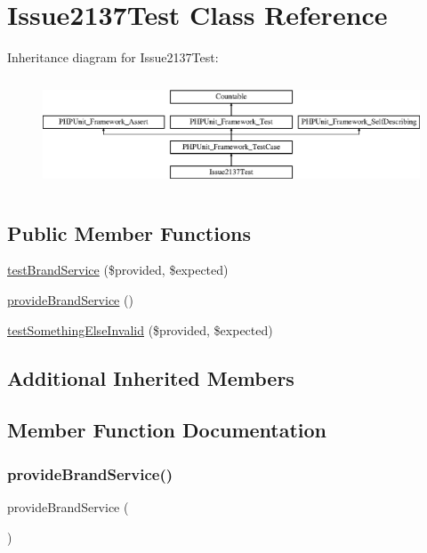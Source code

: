 \hypertarget{class_issue2137_test}{}\section{Issue2137\+Test Class Reference}
\label{class_issue2137_test}
Inheritance diagram for Issue2137\+Test\+:\begin{figure}[H]
\begin{center}
\leavevmode
\includegraphics[height=3.303835cm]{class_issue2137_test}
\end{center}
\end{figure}
\subsection*{Public Member Functions}
\begin{DoxyCompactItemize}
\item 
\mbox{\hyperlink{class_issue2137_test_a870c9c70770a462137e46965bab7e285}{test\+Brand\+Service}} (\$provided, \$expected)
\item 
\mbox{\hyperlink{class_issue2137_test_aa669f850531dd8648cba9cc80ac720c5}{provide\+Brand\+Service}} ()
\item 
\mbox{\hyperlink{class_issue2137_test_ae7e2a2aeeaf5a4e9a06ceb5a895befc7}{test\+Something\+Else\+Invalid}} (\$provided, \$expected)
\end{DoxyCompactItemize}
\subsection*{Additional Inherited Members}


\subsection{Member Function Documentation}
\mbox{\label{class_issue2137_test_aa669f850531dd8648cba9cc80ac720c5}} 
\subsubsection{\texorpdfstring{provide\+Brand\+Service()}{provideBrandService()}}
{\footnotesize\ttfamily provide\+Brand\+Service (\begin{DoxyParamCaption}{ }\end{DoxyParamCaption})}

